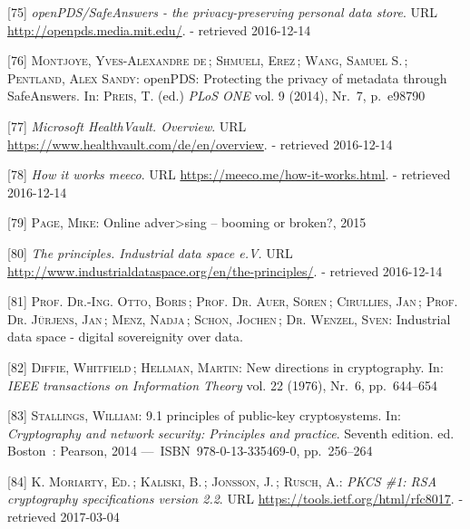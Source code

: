 \documentclass[12pt,english,a4paper,titlepage,cleardoublepage=empty,dottedtoc]{report}
\begin{document}
\hypertarget{ref-web_mit_openpds-safeanswers-project-page}{}
{[}75{]} \emph{openPDS/SafeAnswers - the privacy-preserving personal
data store}. URL \url{http://openpds.media.mit.edu/}. - retrieved
2016-12-14

\hypertarget{ref-paper_2014_openpds_protecting-privacy-of-meta-data-through-safeanswers}{}
{[}76{]} \textsc{Montjoye, Yves-Alexandre de}\,; \textsc{Shmueli,
Erez}\,; \textsc{Wang, Samuel S.}\,; \textsc{Pentland, Alex Sandy}:
openPDS: Protecting the privacy of metadata through SafeAnswers. In:
\textsc{Preis, T.} (ed.) \emph{PLoS ONE} vol. 9 (2014), Nr.~7, p.~e98790

\hypertarget{ref-web_microsoft_healthvault}{}
{[}77{]} \emph{Microsoft HealthVault. Overview}. URL
\url{https://www.healthvault.com/de/en/overview}. - retrieved 2016-12-14

\hypertarget{ref-web_meeco_how-it-works}{}
{[}78{]} \emph{How it works meeco}. URL
\url{https://meeco.me/how-it-works.html}. - retrieved 2016-12-14

\hypertarget{ref-slides_2015_meeco-case-study}{}
{[}79{]} \textsc{Page, Mike}: Online adver\textgreater{}sing -- booming
or broken?, 2015

\hypertarget{ref-web_industrial-data-space}{}
{[}80{]} \emph{The principles. Industrial data space e.V.} URL
\url{http://www.industrialdataspace.org/en/the-principles/}. - retrieved
2016-12-14

\hypertarget{ref-whitepaper_2016_industrial-data-space}{}
{[}81{]} \textsc{Prof. Dr.-Ing. Otto, Boris}\,; \textsc{Prof. Dr. Auer,
Sören}\,; \textsc{Cirullies, Jan}\,; \textsc{Prof. Dr. Jürjens, Jan}\,;
\textsc{Menz, Nadja}\,; \textsc{Schon, Jochen}\,; \textsc{Dr. Wenzel,
Sven}: Industrial data space - digital sovereignity over data.

\hypertarget{ref-paper_1976_d-h-key-exchange}{}
{[}82{]} \textsc{Diffie, Whitfield}\,; \textsc{Hellman, Martin}: New
directions in cryptography. In: \emph{IEEE transactions on Information
Theory} vol. 22 (1976), Nr.~6, pp.~644--654

\hypertarget{ref-book_2014_chapter-9-1-public-key-crypto}{}
{[}83{]} \textsc{Stallings, William}: 9.1 principles of public-key
cryptosystems. In: \emph{Cryptography and network security: Principles
and practice}. Seventh edition. ed. Boston~: Pearson, 2014
---~ISBN~978-0-13-335469-0, pp.~256--264

\hypertarget{ref-web_spec_rsa}{}
{[}84{]} \textsc{K. Moriarty, Ed.}\,; \textsc{Kaliski, B.}\,;
\textsc{Jonsson, J.}\,; \textsc{Rusch, A.}: \emph{PKCS \#1: RSA
cryptography specifications version 2.2}. URL
\url{https://tools.ietf.org/html/rfc8017}. - retrieved 2017-03-04
\end{document}
